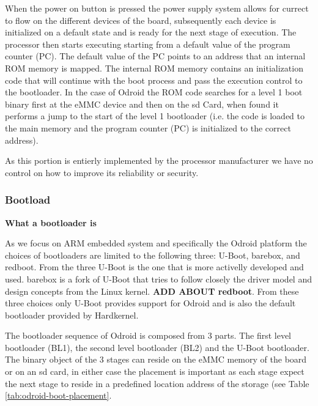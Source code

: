 When the power on button is pressed the power supply system allows for currect to flow on the different devices of the board, subsequently each device is initialized on a default state and is ready for the next stage of execution. The processor then starts executing starting from a default value of the program counter (PC). The default value of the PC points to an address that an internal ROM memory is mapped. The internal ROM memory contains an initialization code that will continue with the boot process and pass the execution control to the bootloader. In the case of Odroid the ROM code searches for a level 1 boot binary first at the eMMC device and then on the sd Card, when found it performs a jump to the start of the level 1 bootloader (i.e. the code is loaded to the main memory and the program counter (PC) is initialized to the correct address).

As this portion is entierly implemented by the processor manufacturer we have no control on how to improve its reliability or security.

\subsubsection{Bootload}

\textbf{What a bootloader is}

As we focus on ARM embedded system and specifically the Odroid platform the choices of bootloaders are limited to the following three: U-Boot, barebox, and redboot. From the three U-Boot is the one that is more activelly developed and used. barebox is a fork of U-Boot that tries to follow closely the driver model and design concepts from the Linux kernel. \textbf{ADD ABOUT redboot}. From these three choices only U-Boot provides support for Odroid and is also the default bootloader provided by Hardkernel.

The bootloader sequence of Odroid is composed from 3 parts. The first level bootloader (BL1), the second level bootloader (BL2) and the U-Boot bootloader. The binary object of the 3 stages can reside on the eMMC memory of the board or on an sd card, in either case the placement is important as each stage expect the next stage to reside in a predefined location address of the storage (see Table \ref{tab:odroid-boot-placement}.

